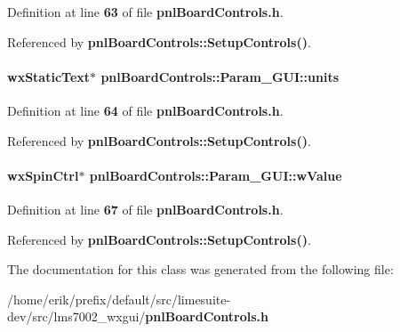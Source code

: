 Definition at line {\bf 63} of file {\bf pnl\+Board\+Controls.\+h}.



Referenced by {\bf pnl\+Board\+Controls\+::\+Setup\+Controls()}.

\paragraph[{units}]{\setlength{\rightskip}{0pt plus 5cm}wx\+Static\+Text$\ast$ pnl\+Board\+Controls\+::\+Param\+\_\+\+G\+U\+I\+::units}\label{classpnlBoardControls_1_1Param__GUI_afb3c482bbca211f9844358c92adec6ff}


Definition at line {\bf 64} of file {\bf pnl\+Board\+Controls.\+h}.



Referenced by {\bf pnl\+Board\+Controls\+::\+Setup\+Controls()}.

\paragraph[{w\+Value}]{\setlength{\rightskip}{0pt plus 5cm}wx\+Spin\+Ctrl$\ast$ pnl\+Board\+Controls\+::\+Param\+\_\+\+G\+U\+I\+::w\+Value}\label{classpnlBoardControls_1_1Param__GUI_a1f01f58b10d4aa722edc46d88f8cdb2c}


Definition at line {\bf 67} of file {\bf pnl\+Board\+Controls.\+h}.



Referenced by {\bf pnl\+Board\+Controls\+::\+Setup\+Controls()}.



The documentation for this class was generated from the following file\+:\begin{DoxyCompactItemize}
\item 
/home/erik/prefix/default/src/limesuite-\/dev/src/lms7002\+\_\+wxgui/{\bf pnl\+Board\+Controls.\+h}\end{DoxyCompactItemize}

